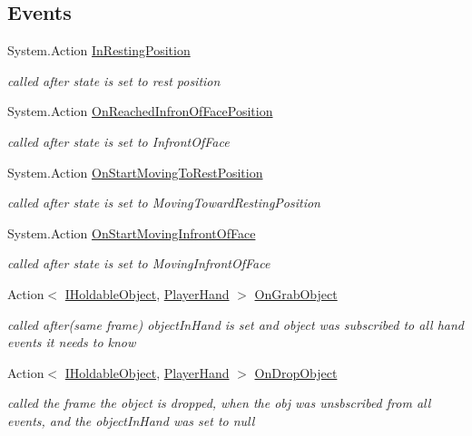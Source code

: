 \subsection*{Events}
\begin{DoxyCompactItemize}
\item 
System.\+Action \mbox{\hyperlink{class_player_hand_aebb1dc8370e71ba7b9965ffa0d4a2532}{In\+Resting\+Position}}
\begin{DoxyCompactList}\small\item\em called after state is set to rest position \end{DoxyCompactList}\item 
System.\+Action \mbox{\hyperlink{class_player_hand_a60b8dd996d175659c87dbea8266ff095}{On\+Reached\+Infron\+Of\+Face\+Position}}
\begin{DoxyCompactList}\small\item\em called after state is set to Infront\+Of\+Face \end{DoxyCompactList}\item 
System.\+Action \mbox{\hyperlink{class_player_hand_a4e94ca5bad6ece9013cd872dcf373074}{On\+Start\+Moving\+To\+Rest\+Position}}
\begin{DoxyCompactList}\small\item\em called after state is set to Moving\+Toward\+Resting\+Position \end{DoxyCompactList}\item 
System.\+Action \mbox{\hyperlink{class_player_hand_a144ea34305e5efa1ffae73c9d1f5fd9d}{On\+Start\+Moving\+Infront\+Of\+Face}}
\begin{DoxyCompactList}\small\item\em called after state is set to Moving\+Infront\+Of\+Face \end{DoxyCompactList}\item 
Action$<$ \mbox{\hyperlink{interface_i_holdable_object}{I\+Holdable\+Object}}, \mbox{\hyperlink{class_player_hand}{Player\+Hand}} $>$ \mbox{\hyperlink{class_player_hand_af3875f350ce765612b5af99e8e9d5837}{On\+Grab\+Object}}
\begin{DoxyCompactList}\small\item\em called after(same frame) object\+In\+Hand is set and object was subscribed to all hand events it needs to know \end{DoxyCompactList}\item 
Action$<$ \mbox{\hyperlink{interface_i_holdable_object}{I\+Holdable\+Object}}, \mbox{\hyperlink{class_player_hand}{Player\+Hand}} $>$ \mbox{\hyperlink{class_player_hand_ac22e288fe18167393a51eec5ad0cbfc0}{On\+Drop\+Object}}
\begin{DoxyCompactList}\small\item\em called the frame the object is dropped, when the obj was unsbscribed from all events, and the object\+In\+Hand was set to null \end{DoxyCompactList}\end{DoxyCompactItemize}
